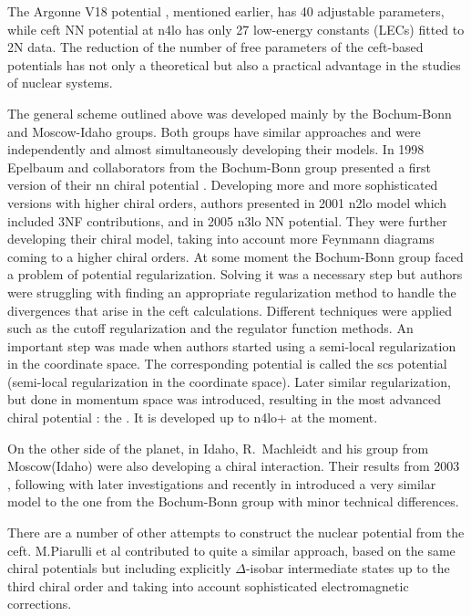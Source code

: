 The Argonne V18 potential \cite{AV18Wiringa}, mentioned earlier, has 40 adjustable parameters,
while \gls{ceft} NN potential at \gls{n4lo} \cite{Machleidt2011} has only 27 low-energy constants (LECs) fitted to 2N data.
The reduction of the number of free parameters of the \gls{ceft}-based potentials
has not only a theoretical but also a practical advantage in the studies of nuclear systems.

The general scheme outlined above was developed mainly by the Bochum-Bonn and Moscow-Idaho groups.
Both groups have similar approaches and were independently and almost simultaneously
developing their models. In 1998 Epelbaum and collaborators from the Bochum-Bonn group 
presented a first version of their \gls{nn} chiral potential \cite{EPELBAOUM1998107, epelbaum2000two}.
Developing more and more sophisticated versions with higher chiral orders, authors presented
in 2001 \cite{epelbaum_physrevc_2002} \gls{n2lo} model which included 3NF contributions,
and in 2005 \cite{epelbaum2005two} \gls{n3lo} NN potential.
They were further developing their chiral model, taking into account more Feynmann diagrams
coming to a higher chiral orders.
At some moment the Bochum-Bonn group faced a problem of potential regularization\cite{skibinski_3H, Witala_2014}.
Solving it was a necessary step but authors
were struggling with finding an appropriate
regularization method to handle the divergences that arise in the \gls{ceft} calculations.
Different techniques were applied such as the cutoff regularization and the regulator function methods.
An important step was made when authors started using a semi-local regularization 
in the coordinate space. The corresponding potential is called the \gls{scs} potential
(semi-local regularization in the coordinate space)\cite{Epelbaum2014SCS}.
Later similar regularization,
but done in momentum space was introduced, resulting in the most advanced chiral potential 
\cite{reinkrebs2018}: the . It is developed up to \gls{n4lo+} at the moment.

On the other side of the planet, in Idaho, R.~Machleidt and his group from Moscow(Ida\-ho) were also developing 
a chiral interaction. Their results from 2003 \cite{Entem2003}, following with later 
investigations \cite{Machleidt2005, Machleidt2010} and recently in \cite{Entem2017}
introduced a very similar model
to the one from the Bochum-Bonn group with minor technical differences.


There are a number of other attempts to construct the nuclear
potential from the \gls{ceft}.
M.Piarulli et al \cite{Piarulli2012,Piarulli2015} contributed
to quite a similar approach, based on
the same chiral potentials but including explicitly 
$\Delta$-isobar intermediate states 
up to the third chiral order and taking into account
sophisticated electromagnetic corrections.


